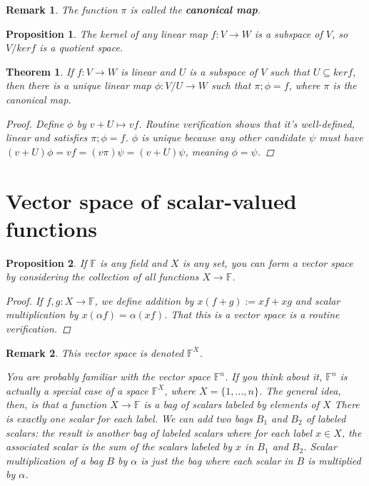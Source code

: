 \documentclass[a4paper,14pt]{article}
\newtheorem*{prop}{Proposition}
\newtheorem*{remark}{Remark}
\newtheorem*{thm}{Theorem}
\begin{document}
\begin{remark}
The function $\pi$ is called the \textbf{canonical map}.
\end{remark}

\begin{prop}
The kernel of any linear map $f: V \to W$ is a subspace of $V$, so $V / ker f$ is a quotient space.
\end{prop}

\begin{thm}
If $f: V \to W$ is linear and $U$ is a subspace of $V$ such that $U \subseteq ker f$, then there is a unique linear map $\phi: V / U \to W$ such that $\pi ; \phi = f$, where $\pi$ is the canonical map.

\begin{proof}
    Define $\phi$ by $v + U \mapsto vf$. Routine verification shows that it's well-defined, linear and satisfies $\pi ; \phi = f$. $\phi$ is unique because any other candidate $\psi$ must have $(v + U)\phi = vf = (v \pi) \psi = (v + U) \psi$, meaning $\phi = \psi$.
\end{proof}
\end{thm}

\section{Vector space of scalar-valued functions}
\begin{prop}
If $\mathbb{F}$ is any field and $X$ is any set, you can form a vector space by considering the collection of all functions $X \to \mathbb{F}$. 

\begin{proof}
If $f, g: X \to \mathbb{F}$, we define addition by $x(f + g) := xf + xg$ and scalar multiplication by $x(\alpha f) = \alpha (x f)$. That this is a vector space is a routine verification.
\end{proof}
\end{prop}

\begin{remark}
This vector space is denoted $\mathbb{F}^X$.

You are probably familiar with the vector space $\mathbb{F}^n$. If you think about it, $\mathbb{F}^n$ is actually a special case of a space $\mathbb{F}^X$, where $X = \{1, \ldots, n\}$. The general idea, then, is that a function $X \to \mathbb{F}$ is a bag of scalars labeled by elements of $X$ There is exactly one scalar for each label. We can add two bags $B_1$ and $B_2$ of labeled scalars: the result is another bag of labeled scalars where for each label $x \in X$, the associated scalar is the sum of the scalars labeled by $x$ in $B_1$ and $B_2$. Scalar multiplication of a bag $B$ by $\alpha$ is just the bag where each scalar in $B$ is multiplied by $\alpha$.
\end{remark}
\end{document}
